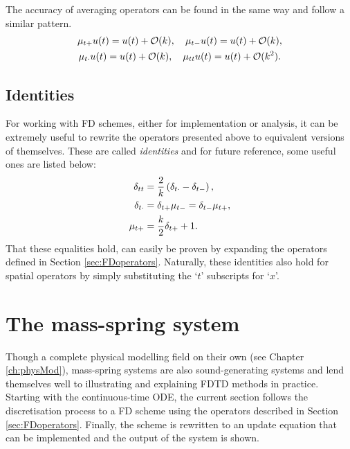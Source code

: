 The accuracy of averaging operators can be found in the same way and follow a similar pattern. 
\begin{equation}
    \begin{gathered}
    \mu_{t+} u(t) = u(t) + \mathcal{O}(k),\quad \mu_{t-} u(t)= u(t) + \mathcal{O}(k),\\
    \mu_{t\cdot} u(t)= u(t) + \mathcal{O}(k), \quad \mu_{tt} u(t)= u(t) + \mathcal{O}(k^2).
    \end{gathered}
\end{equation}

\subsection{Identities}
For working with FD schemes, either for implementation or analysis, it can be extremely useful to rewrite the operators presented above to equivalent versions of themselves. These are called \textit{identities} and for future reference, some useful ones are listed below:
\begin{subequations}
    \begin{align}
        \delta_{tt} &= \frac{2}{k}\left(\delta_{t\cdot}- \delta_{t-}\right),\label{eq:identity1}\\
        \delta_{t\cdot} &= \delta_{t+}\mu_{t-} = \delta_{t-}\mu_{t+}\label{eq:identity2},\\
        \mu_{t+} &= \frac{k}{2}\delta_{t+} + 1\label{eq:identity3}.
    \end{align}
\end{subequations}
That these equalities hold, can easily be proven by expanding the operators defined in Section \ref{sec:FDoperators}. Naturally, these identities also hold for spatial operators by simply substituting the `$t$' subscripts for `$x$'. 

\section{%
The mass-spring system}\label{sec:massSpringSystem}
Though a complete physical modelling field on their own (see Chapter \ref{ch:physMod}), mass-spring systems are also sound-generating systems and lend themselves well to illustrating and explaining FDTD methods in practice. Starting with the continuous-time ODE, the current section follows the discretisation process to a FD scheme using the operators described in Section \ref{sec:FDoperators}. Finally, the scheme is rewritten to an update equation that can be implemented and the output of the system is shown. 

